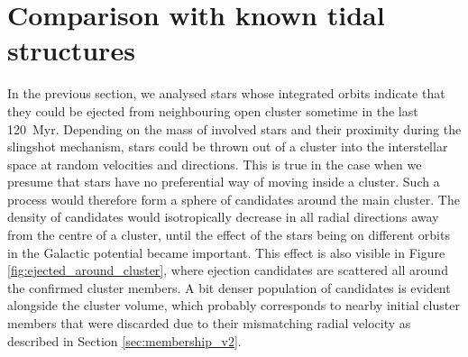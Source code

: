 \section{Comparison with known tidal structures}
\label{sec:tails_chem}
In the previous section, we analysed stars whose integrated orbits indicate that they could be ejected from neighbouring open cluster sometime in the last 120~Myr. Depending on the mass of involved stars and their proximity during the slingshot mechanism, stars could be thrown out of a cluster into the interstellar space at random velocities and directions. This is true in the case when we presume that stars have no preferential way of moving inside a cluster. Such a process would therefore form a sphere of candidates around the main cluster. The density of candidates would isotropically decrease in all radial directions away from the centre of a cluster, until the effect of the stars being on different orbits in the Galactic potential became important. This effect is also visible in Figure \ref{fig:ejected_around_cluster}, where ejection candidates are scattered all around the confirmed cluster members. A bit denser population of candidates is evident alongside the cluster volume, which probably corresponds to nearby initial cluster members that were discarded due to their mismatching radial velocity as described in Section \ref{sec:membership_v2}.

